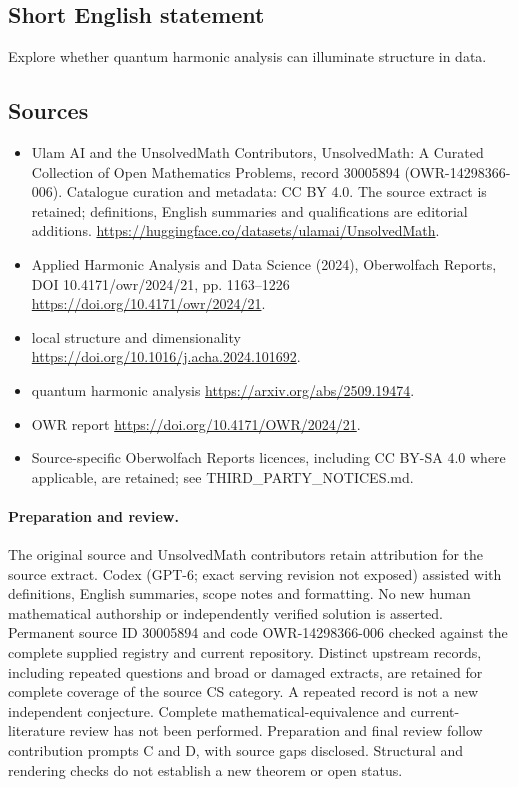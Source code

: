 \documentclass[11pt]{article}
\begin{document}
\subsection{Short English statement}
Explore whether quantum harmonic analysis can illuminate structure in data.
\subsection{Sources}
\begin{itemize}
\item[\hypertarget{source:30005894:1}{S1}] Ulam AI and the UnsolvedMath Contributors, UnsolvedMath: A Curated Collection of Open Mathematics Problems, record 30005894 (OWR-14298366-006). Catalogue curation and metadata: CC BY 4.0. The source extract is retained; definitions, English summaries and qualifications are editorial additions.
\url{https://huggingface.co/datasets/ulamai/UnsolvedMath}.
\item[\hypertarget{source:30005894:2}{S2}] Applied Harmonic Analysis and Data Science (2024), Oberwolfach Reports, DOI 10.4171/owr/2024/21, pp. 1163--1226
\url{https://doi.org/10.4171/owr/2024/21}.
\item[\hypertarget{source:30005894:3}{S3}] local structure and dimensionality
\url{https://doi.org/10.1016/j.acha.2024.101692}.
\item[\hypertarget{source:30005894:4}{S4}] quantum harmonic analysis
\url{https://arxiv.org/abs/2509.19474}.
\item[\hypertarget{source:30005894:5}{S5}] OWR report
\url{https://doi.org/10.4171/OWR/2024/21}.
\item Source-specific Oberwolfach Reports licences, including CC BY-SA 4.0 where applicable, are retained; see THIRD\_PARTY\_NOTICES.md.
\end{itemize}
\paragraph{Preparation and review.}
The original source and UnsolvedMath contributors retain attribution for the source extract. Codex (GPT-6; exact serving revision not exposed) assisted with definitions, English summaries, scope notes and formatting. No new human mathematical authorship or independently verified solution is asserted. Permanent source ID 30005894 and code OWR-14298366-006 checked against the complete supplied registry and current repository. Distinct upstream records, including repeated questions and broad or damaged extracts, are retained for complete coverage of the source CS category. A repeated record is not a new independent conjecture. Complete mathematical-equivalence and current-literature review has not been performed. Preparation and final review follow contribution prompts C and D, with source gaps disclosed. Structural and rendering checks do not establish a new theorem or open status.
\label{end:30005894}
\end{document}
